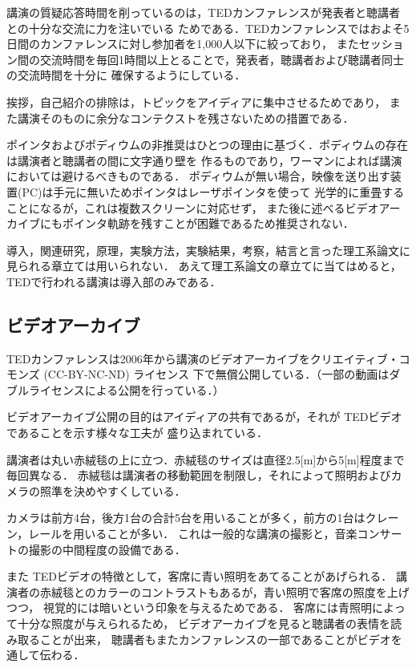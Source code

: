 \documentclass[submit,techreq,noauthor]{ipsj}
\newcommand{\TED}{\textsf{TED}}
\begin{document}
講演の質疑応答時間を削っているのは，\TED カンファレンスが発表者と聴講者との十分な交流に力を注いでいる
ためである．\TED カンファレンスではおよそ5日間のカンファレンスに対し参加者を1,000人以下に絞っており，
またセッション間の交流時間を毎回1時間以上とることで，発表者，聴講者および聴講者同士の交流時間を十分に
確保するようにしている．

挨拶，自己紹介の排除は，トピックをアイディアに集中させるためであり，
また講演そのものに余分なコンテクストを残さないための措置である．

ポインタおよびポディウムの非推奨はひとつの理由に基づく．ポディウムの存在は講演者と聴講者の間に文字通り壁を
作るものであり，ワーマンによれば講演においては避けるべきものである．
ポディウムが無い場合，映像を送り出す装置(PC)は手元に無いためポインタはレーザポインタを使って
光学的に重畳することになるが，これは複数スクリーンに対応せず，
また後に述べるビデオアーカイブにもポインタ軌跡を残すことが困難であるため推奨されない．

導入，関連研究，原理，実験方法，実験結果，考察，結言と言った理工系論文に見られる章立ては用いられない．
あえて理工系論文の章立てに当てはめると，\TED で行われる講演は導入部のみである．

\subsection{ビデオアーカイブ}

\TED カンファレンスは2006年から講演のビデオアーカイブをクリエイティブ・コモンズ (CC-BY-NC-ND) ライセンス
下で無償公開している．（一部の動画はダブルライセンスによる公開を行っている．）

ビデオアーカイブ公開の目的はアイディアの共有であるが，それが \TED ビデオであることを示す様々な工夫が
盛り込まれている．

講演者は丸い赤絨毯の上に立つ．赤絨毯のサイズは直径2.5[m]から5[m]程度まで毎回異なる．
赤絨毯は講演者の移動範囲を制限し，それによって照明およびカメラの照準を決めやすくしている．

カメラは前方4台，後方1台の合計5台を用いることが多く，前方の1台はクレーン，レールを用いることが多い．
これは一般的な講演の撮影と，音楽コンサートの撮影の中間程度の設備である．

また \TED ビデオの特徴として，客席に青い照明をあてることがあげられる．
講演者の赤絨毯とのカラーのコントラストもあるが，青い照明で客席の照度を上げつつ，
視覚的には暗いという印象を与えるためである．
客席には青照明によって十分な照度が与えられるため，
ビデオアーカイブを見ると聴講者の表情を読み取ることが出来，
聴講者もまたカンファレンスの一部であることがビデオを通して伝わる．
\end{document}
